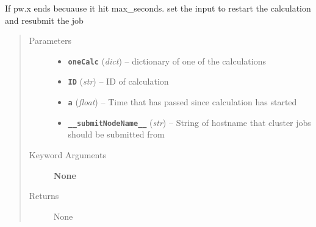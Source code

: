 \documentclass[letterpaper,10pt,english]{sphinxmanual}
\begin{document}

\begin{fulllineitems}
\label{run:run.__restartGIPAW}
If pw.x ends becuause it hit max\_seconds. set the input to restart the calculation
and resubmit the job
\begin{quote}\begin{description}
\item[{Parameters}] \leavevmode\begin{itemize}
\item {} 
\textbf{\texttt{oneCalc}} (\emph{dict}) -- dictionary of one of the calculations

\item {} 
\textbf{\texttt{ID}} (\emph{str}) -- ID of calculation

\item {} 
\textbf{\texttt{a}} (\emph{float}) -- Time that has passed since calculation has started

\item {} 
\textbf{\texttt{\_\_submitNodeName\_\_}} (\emph{str}) -- String of hostname that cluster jobs should be submitted from

\end{itemize}

\item[{Keyword Arguments}] \leavevmode
\textbf{None}

\item[{Returns}] \leavevmode
None

\end{description}\end{quote}

\end{fulllineitems}

\end{document}
